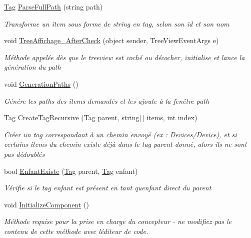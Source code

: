 \begin{DoxyCompactItemize}
\mbox{\hyperlink{class_m_t_connect_agent_1_1_model_1_1_tag}{Tag}} \mbox{\hyperlink{class_m_t_connect_agent_1_1_user_control_display_tab_adee83739d03527dcd7dd13c95d8ca3c9}{Parse\+Full\+Path}} (string path)
\begin{DoxyCompactList}\small\item\em Transforme un item sous forme de string en tag, selon son id et son nom \end{DoxyCompactList}\item 
void \mbox{\hyperlink{class_m_t_connect_agent_1_1_user_control_display_tab_a867300e7d41f63cf0e728ba0f137af94}{Tree\+Affichage\+\_\+\+After\+Check}} (object sender, Tree\+View\+Event\+Args e)
\begin{DoxyCompactList}\small\item\em Méthode appelée dès que le treeview est coché ou décocher, initialise et lance la génération du path \end{DoxyCompactList}\item 
void \mbox{\hyperlink{class_m_t_connect_agent_1_1_user_control_display_tab_ab942bfad7bf216e1b4915f0841d8c42f}{Generation\+Paths}} ()
\begin{DoxyCompactList}\small\item\em Génére les paths des items demandés et les ajoute à la fenêtre path \end{DoxyCompactList}\item 
\mbox{\hyperlink{class_m_t_connect_agent_1_1_model_1_1_tag}{Tag}} \mbox{\hyperlink{class_m_t_connect_agent_1_1_user_control_display_tab_a7fc3123014a0546fd4fb29d2ced80183}{Create\+Tag\+Recursive}} (\mbox{\hyperlink{class_m_t_connect_agent_1_1_model_1_1_tag}{Tag}} parent, string\mbox{[}$\,$\mbox{]} items, int index)
\begin{DoxyCompactList}\small\item\em Créer un tag correspondant à un chemin envoyé (ex \+: Devices/\+Device), et si certains items du chemin existe déjà dans le tag parent donné, alors ils ne sont pas dédoublés \end{DoxyCompactList}\item 
bool \mbox{\hyperlink{class_m_t_connect_agent_1_1_user_control_display_tab_ae8831a67e98923b77b22df4e35842a17}{Enfant\+Existe}} (\mbox{\hyperlink{class_m_t_connect_agent_1_1_model_1_1_tag}{Tag}} parent, \mbox{\hyperlink{class_m_t_connect_agent_1_1_model_1_1_tag}{Tag}} enfant)
\begin{DoxyCompactList}\small\item\em Vérifie si le tag enfant est présent en tant qu\textquotesingle{}enfant direct du parent \end{DoxyCompactList}\item 
void \mbox{\hyperlink{class_m_t_connect_agent_1_1_user_control_display_tab_a7280eefa02218d37616dadb3c0e01136}{Initialize\+Component}} ()
\begin{DoxyCompactList}\small\item\em Méthode requise pour la prise en charge du concepteur -\/ ne modifiez pas le contenu de cette méthode avec l\textquotesingle{}éditeur de code. \end{DoxyCompactList}\end{DoxyCompactItemize}

